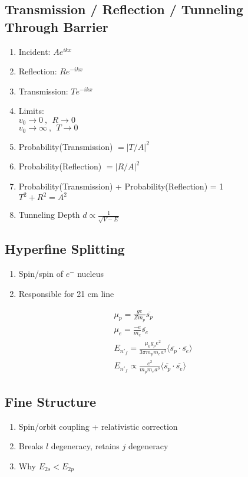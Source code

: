 \documentclass[10pt,letter]{article}
\begin{document}
\subsection{Transmission / Reflection / Tunneling Through Barrier}

\begin{enumerate}
    \item Incident: $Ae^{ikx}$
    \item Reflection: $Re^{-ikx}$ 
    \item Transmission: $Te^{-ikx}$
    \item Limits: \\
    $v_0 \rightarrow 0~,~~ R \rightarrow 0$\\
    $v_0 \rightarrow \infty ~,~~ T \rightarrow 0$
    \item Probability(Transmission) $=|T/A|^2$ 
    \item Probability(Reflection) $=|R/A|^2$
    \item Probability(Transmission) + Probability(Reflection) = 1\\
    $T^2 + R^2 = A^2$
    \item Tunneling Depth $d \propto \frac{1}{\sqrt{V-E}} $
\end{enumerate}

\subsection{Hyperfine Splitting}
\begin{enumerate}
    \item Spin/spin of $e^-$ nucleus
    \item Responsible for 21 cm line 
\end{enumerate}

\begin{align}
 \mu_p = \frac{ge}{Zm_p}\overline{s_p}\\
 \mu_e = \frac{-e}{m_e}\overline{s_e}\\
 E_{n'_f} = \frac{\mu_0 g_p e^2}{3 \pi m_p m_e a^3} \langle \overline{s_p} \cdot \overline{s_e} \rangle\\
 E_{n'_f} \propto \frac{e^2}{m_pm_ea^3} \langle \overline{s_p} \cdot \overline{s_e} \rangle
\end{align}

\subsection{Fine Structure}
\begin{enumerate}
    \item Spin/orbit coupling + relativistic correction
    \item Breaks $l$ degeneracy, retains $j$ degeneracy
    \item Why $E_{2s} < E_{2p}$
\end{enumerate}
\end{document}
